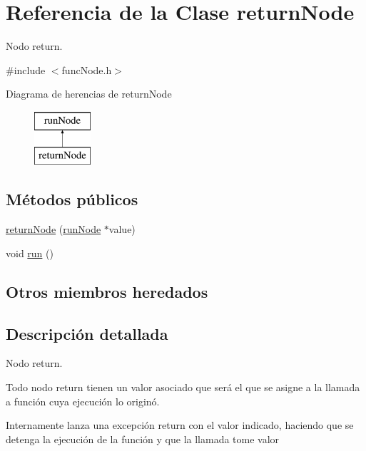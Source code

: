 \hypertarget{classreturnNode}{\section{Referencia de la Clase return\-Node}
\label{classreturnNode}
}


Nodo return.  




{\ttfamily \#include $<$func\-Node.\-h$>$}

Diagrama de herencias de return\-Node\begin{figure}[H]
\begin{center}
\leavevmode
\includegraphics[height=2.000000cm]{classreturnNode}
\end{center}
\end{figure}
\subsection*{Métodos públicos}
\begin{DoxyCompactItemize}
\item 
\hyperlink{classreturnNode_a23cea3401fbaca793938f5995442013a}{return\-Node} (\hyperlink{classrunNode}{run\-Node} $\ast$value)
\item 
void \hyperlink{classreturnNode_abad8b5f36635ebc83cfc538d265779ff}{run} ()
\end{DoxyCompactItemize}
\subsection*{Otros miembros heredados}


\subsection{Descripción detallada}
Nodo return. 

Todo nodo return tienen un valor asociado que será el que se asigne a la llamada a función cuya ejecución lo originó.

Internamente lanza una excepción return con el valor indicado, haciendo que se detenga la ejecución de la función y que la llamada tome valor 

